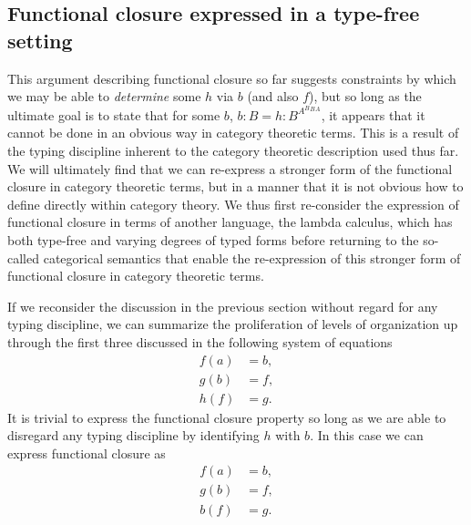 \subsection*{Functional closure expressed in a type-free setting}
This argument describing functional closure so far suggests constraints by which we may be able to \emph{determine} some $h$ via $b$ (and also $f$), but so long as the ultimate goal is to state that for some $b$, $b:B = h:B^{A^B{^B{^A}}}$, it appears that it cannot be done in an obvious way in category theoretic terms. This is a result of the typing discipline inherent to the category theoretic description used thus far. We will ultimately find that we can re-express a stronger form of the functional closure in category theoretic terms, but in a manner that it is not obvious how to define directly within category theory. We thus first re-consider the expression of functional closure in terms of another language, the lambda calculus, which has both type-free and varying degrees of typed forms \cite{Barendregt1985} before returning to the so-called categorical semantics that enable the re-expression of this stronger form of functional closure in category theoretic terms.

If we reconsider the discussion in the previous section without regard for any typing discipline, we can summarize the proliferation of levels of organization up through the first three discussed in the following system of equations
\begin{align*}
f(a)&=b,\\
g(b)&=f,\\
h(f)&=g.
\end{align*}
It is trivial to express the functional closure property so long as we are able to disregard any typing discipline by identifying $h$ with $b$. In this case we can express functional closure as
\begin{align*}
f(a)&=b,\\
g(b)&=f,\\
b(f)&=g.
\end{align*}

